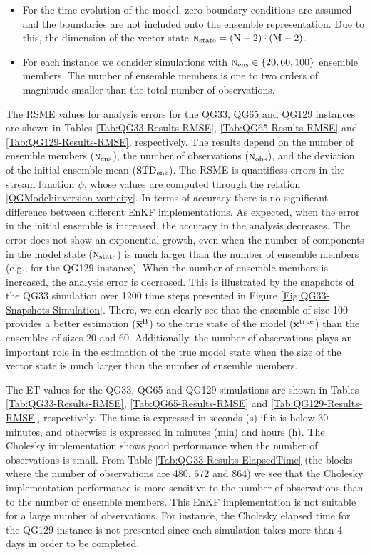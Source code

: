 \documentclass[12pt]{article}
\newcommand{\Nobs}{\textsc{n}_{{\rm obs}}}
\newcommand{\Nens}{\textsc{n}_{{\rm ens}}}
\newcommand{\Nstate}{\textsc{n}_{{\rm state}}}
\newcommand{\xmean}{{\bf \overline{x}}^{\rm B}}
\newcommand{\xt}{{\bf x}^{\rm true}}
\begin{document}
\begin{itemize}
\item For the time evolution of the model, zero boundary conditions are assumed and the boundaries are not included onto the ensemble representation.  Due to this, the dimension of the vector state ${\Nstate} = \rm (N-2) \cdot (M-2)$.

\item For each instance we consider simulations with $\Nens \in \{ 20, 60, 100\}$ ensemble members. The number of ensemble members is one to two orders of magnitude smaller than the total number of observations.

\end{itemize}


The RSME values for analysis errors for the QG33, QG65 and QG129 instances are shown in Tables  \ref{Tab:QG33-Results-RMSE}, \ref{Tab:QG65-Results-RMSE} and  \ref{Tab:QG129-Results-RMSE}, respectively. The results depend on the number of ensemble members ($\Nens$), the number of observations ($\Nobs$), and the deviation of the initial ensemble mean ($\rm STD_{ens}$). The RSME is quantifiess errors in the stream function $\psi$, whose values are computed through the relation \eqref{QGModel:inversion-vorticity}.  In terms of accuracy there is no significant difference between different EnKF implementations. As expected, when the error in the initial ensemble is increased, the accuracy in the analysis decreases. The error does not show an exponential growth, even when the number of components in the model state ($\Nstate$) is much larger than the number of ensemble members (e.g., for the QG129 instance). When the number of ensemble members is increased, the analysis error is decreased. This is illustrated by the snapshots of the QG33 simulation over 1200 time steps presented in Figure  \ref{Fig:QG33-Snapshots-Simulation}. There, we can clearly see that the ensemble of size 100 provides a better estimation ($\xmean$) to the true state of the model ($\xt$) than the ensembles of sizes 20 and 60. Additionally, the number of observations plays an important role in the estimation of the true model state when the size of the vector state is much larger than the number of ensemble members. 

The ET values for the QG33, QG65 and QG129 simulations are shown in Tables  \ref{Tab:QG33-Results-RMSE}, \ref{Tab:QG65-Results-RMSE} and  \ref{Tab:QG129-Results-RMSE}, respectively. The time is expressed in seconds (s)
if it is below 30 minutes, and otherwise is expressed
in minutes (min) and hours (h). The Cholesky implementation shows good performance when the number of observations is small. From Table  \ref{Tab:QG33-Results-ElapsedTime} (the blocks where the number of observations are 480, 672 and 864) we see that the Cholesky implementation performance is more sensitive to the number of observations than to the number of ensemble members. 
This EnKF implementation is not suitable for a large number of observations. For instance, the Cholesky elapsed time for the QG129 instance is not presented since each simulation takes more than 4 days in order to be completed. 
\end{document}
